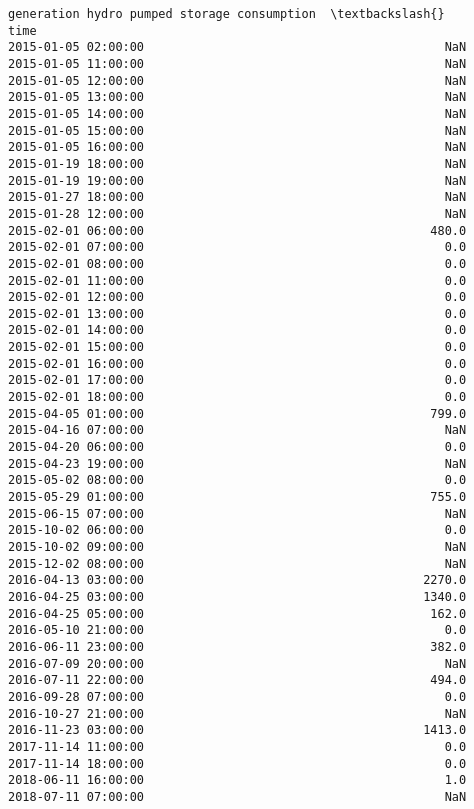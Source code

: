 \documentclass[11pt]{article}
\begin{document}
\begin{tcolorbox}[breakable, size=fbox, boxrule=.5pt, pad at break*=1mm, opacityfill=0]
\begin{Verbatim}[commandchars=\\\{\}]
                     generation hydro pumped storage consumption  \textbackslash{}
time
2015-01-05 02:00:00                                          NaN
2015-01-05 11:00:00                                          NaN
2015-01-05 12:00:00                                          NaN
2015-01-05 13:00:00                                          NaN
2015-01-05 14:00:00                                          NaN
2015-01-05 15:00:00                                          NaN
2015-01-05 16:00:00                                          NaN
2015-01-19 18:00:00                                          NaN
2015-01-19 19:00:00                                          NaN
2015-01-27 18:00:00                                          NaN
2015-01-28 12:00:00                                          NaN
2015-02-01 06:00:00                                        480.0
2015-02-01 07:00:00                                          0.0
2015-02-01 08:00:00                                          0.0
2015-02-01 11:00:00                                          0.0
2015-02-01 12:00:00                                          0.0
2015-02-01 13:00:00                                          0.0
2015-02-01 14:00:00                                          0.0
2015-02-01 15:00:00                                          0.0
2015-02-01 16:00:00                                          0.0
2015-02-01 17:00:00                                          0.0
2015-02-01 18:00:00                                          0.0
2015-04-05 01:00:00                                        799.0
2015-04-16 07:00:00                                          NaN
2015-04-20 06:00:00                                          0.0
2015-04-23 19:00:00                                          NaN
2015-05-02 08:00:00                                          0.0
2015-05-29 01:00:00                                        755.0
2015-06-15 07:00:00                                          NaN
2015-10-02 06:00:00                                          0.0
2015-10-02 09:00:00                                          NaN
2015-12-02 08:00:00                                          NaN
2016-04-13 03:00:00                                       2270.0
2016-04-25 03:00:00                                       1340.0
2016-04-25 05:00:00                                        162.0
2016-05-10 21:00:00                                          0.0
2016-06-11 23:00:00                                        382.0
2016-07-09 20:00:00                                          NaN
2016-07-11 22:00:00                                        494.0
2016-09-28 07:00:00                                          0.0
2016-10-27 21:00:00                                          NaN
2016-11-23 03:00:00                                       1413.0
2017-11-14 11:00:00                                          0.0
2017-11-14 18:00:00                                          0.0
2018-06-11 16:00:00                                          1.0
2018-07-11 07:00:00                                          NaN


\end{Verbatim}
\end{tcolorbox}
\end{document}
